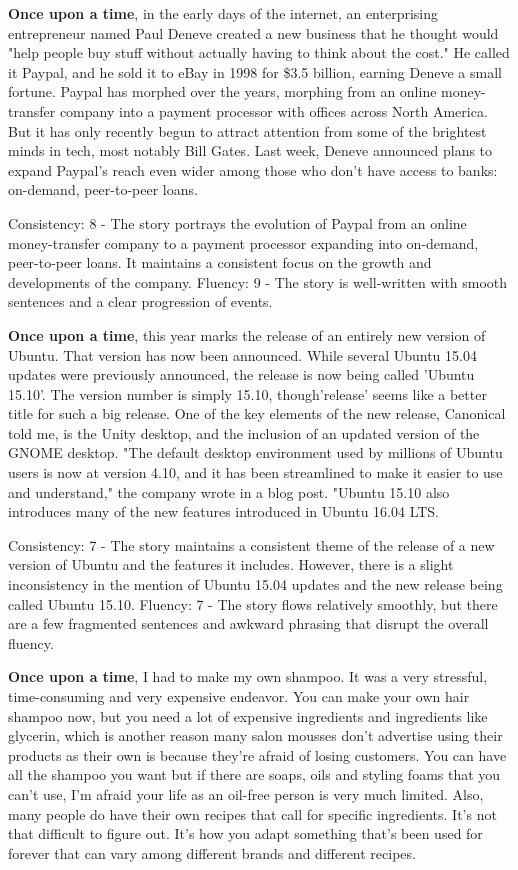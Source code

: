 \documentclass{article}
\begin{document}
\textbf{Once upon a time}, in the early days of the internet, an enterprising entrepreneur named Paul Deneve created a new business that he thought would "help people buy stuff without actually having to think about the cost." He called it Paypal, and he sold it to eBay in 1998 for \$3.5 billion, earning Deneve a small fortune. Paypal has morphed over the years, morphing from an online money-transfer company into a payment processor with offices across North America. But it has only recently begun to attract attention from some of the brightest minds in tech, most notably Bill Gates. Last week, Deneve announced plans to expand Paypal's reach even wider among those who don't have access to banks: on-demand, peer-to-peer loans.

Consistency: 8 - The story portrays the evolution of Paypal from an online money-transfer company to a payment processor expanding into on-demand, peer-to-peer loans. It maintains a consistent focus on the growth and developments of the company.
Fluency: 9 - The story is well-written with smooth sentences and a clear progression of events.

\textbf{Once upon a time}, this year marks the release of an entirely new version of Ubuntu. That version has now been announced. While several Ubuntu 15.04 updates were previously announced, the release is now being called 'Ubuntu 15.10'. The version number is simply 15.10, though'release' seems like a better title for such a big release. One of the key elements of the new release, Canonical told me, is the Unity desktop, and the inclusion of an updated version of the GNOME desktop. "The default desktop environment used by millions of Ubuntu users is now at version 4.10, and it has been streamlined to make it easier to use and understand," the company wrote in a blog post. "Ubuntu 15.10 also introduces many of the new features introduced in Ubuntu 16.04 LTS.

Consistency: 7 - The story maintains a consistent theme of the release of a new version of Ubuntu and the features it includes. However, there is a slight inconsistency in the mention of Ubuntu 15.04 updates and the new release being called Ubuntu 15.10.
Fluency: 7 - The story flows relatively smoothly, but there are a few fragmented sentences and awkward phrasing that disrupt the overall fluency.

\textbf{Once upon a time}, I had to make my own shampoo. It was a very stressful, time-consuming and very expensive endeavor. You can make your own hair shampoo now, but you need a lot of expensive ingredients and ingredients like glycerin, which is another reason many salon mousses don't advertise using their products as their own is because they're afraid of losing customers. You can have all the shampoo you want but if there are soaps, oils and styling foams that you can't use, I'm afraid your life as an oil-free person is very much limited. Also, many people do have their own recipes that call for specific ingredients. It's not that difficult to figure out. It's how you adapt something that's been used for forever that can vary among different brands and different recipes.
\end{document}
